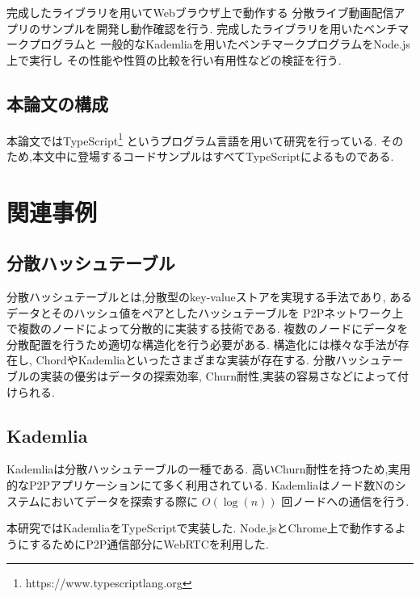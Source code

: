 \documentclass[sotsuron]{jcsie}
\begin{document}
完成したライブラリを用いてWebブラウザ上で動作する
分散ライブ動画配信アプリのサンプルを開発し動作確認を行う.
完成したライブラリを用いたベンチマークプログラムと
一般的なKademliaを用いたベンチマークプログラムをNode.js上で実行し
その性能や性質の比較を行い有用性などの検証を行う.

\section{本論文の構成}
本論文ではTypeScript\footnote{https://www.typescriptlang.org}
というプログラム言語を用いて研究を行っている.
そのため,本文中に登場するコードサンプルはすべてTypeScriptによるものである.


\chapter{関連事例}
\section{分散ハッシュテーブル}
分散ハッシュテーブルとは,分散型のkey-valueストアを実現する手法であり,
あるデータとそのハッシュ値をペアとしたハッシュテーブルを
P2Pネットワーク上で複数のノードによって分散的に実装する技術である.
複数のノードにデータを分散配置を行うため適切な構造化を行う必要がある.
構造化には様々な手法が存在し,
ChordやKademliaといったさまざまな実装が存在する.
分散ハッシュテーブルの実装の優劣はデータの探索効率,
Churn耐性,実装の容易さなどによって付けられる.

\section{Kademlia}
Kademliaは分散ハッシュテーブルの一種である.
高いChurn耐性を持つため,実用的なP2Pアプリケーションにて多く利用されている.
Kademliaはノード数Nのシステムにおいてデータを探索する際に
$O(\log(n))$ 回ノードへの通信を行う.

本研究ではKademliaをTypeScriptで実装した.
Node.jsとChrome上で動作するようにするためにP2P通信部分にWebRTCを利用した.
\end{document}

